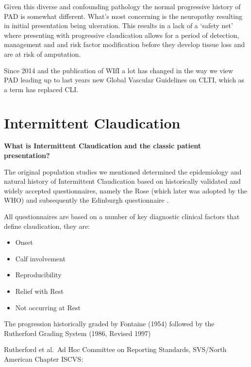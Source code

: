 \documentclass[
]{book}
\begin{document}
Given this diverse and confounding pathology the normal progressive
history of PAD is somewhat different. What's most concerning is the
neuropathy resulting in initial presentation being ulceration. This
results in a lack of a `safety net' where presenting with progressive
claudication allows for a period of detection, management and and risk
factor modification before they develop tissue loss and are at risk of
amputation.

Since 2014 and the publication of WIfI a lot has changed in the way we
view PAD leading up to last years new Global Vascular Guidelines on
CLTI, which as a term has replaced CLI.
\citep{millsSocietyVascularSurgery2014a, conteGlobalVascularGuidelines2019a}

\hypertarget{intermittent-claudication}{%
\section{Intermittent Claudication}\label{intermittent-claudication}}

\textbf{What is Intermittent Claudication and the classic patient
presentation?}

The original population studies we mentioned determined the epidemiology
and natural history of Intermittent Claudication based on historically
validated and widely accepted questionnaires, namely the Rose
\citep{roseDiagnosisIschaemicHeart1962} (which later was adopted by the WHO)
and subsequently the Edinburgh questionnaire
\citep{lendEdinburghClaudicationQuestionnaire1992}.

All questionnaires are based on a number of key diagnostic clinical
factors that define claudication, they are:

\begin{itemize}
\item
  Onset
\item
  Calf involvement
\item
  Reproducibility
\item
  Relief with Rest
\item
  Not occurring at Rest
\end{itemize}

The progression historically graded by Fontaine (1954)
\citep{fontaineSurgicalTreatmentPeripheral1954} followed by the Rutherford
Grading System (1986, Revised 1997)
\citep{rutherfordRecommendedStandardsReports1997}

Rutherford et al.~Ad Hoc Committee on Reporting Standards, SVS/North
American Chapter ISCVS:
\end{document}
